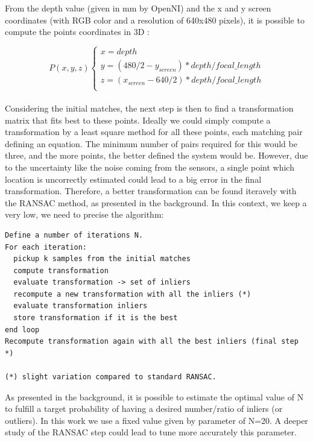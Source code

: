 From the depth value (given in mm by OpenNI) and the x and y screen coordinates (with RGB color and a resolution of 640x480 pixels), it is possible to compute the points coordinates in 3D :

\[
P(x,y,z)\left\{
\begin{array}{l}
x = depth \\
y = (480/2 - y_{screen}) * depth / focal\_length \\
z = (x_{screen} - 640/2) * depth / focal\_length \\
\end{array}
\right.
\]

\paragraph{}
Considering the initial matches, the next step is then to find a transformation matrix that fits best to these points. Ideally we could simply compute a transformation by a least square method for all these points, each matching pair defining an equation. The minimum number of pairs required for this would be three, and the more points, the better defined the system would be. However, due to the uncertainty like the noise coming from the sensors, a single point which location is uncorrectly estimated could lead to a big error in the final transformation. Therefore, a better transformation can be found iteravely with the \gls{RANSAC} method, as presented in the background. In this context, we keep a very low, we need to precise the algorithm:

\begin{verbatim}
Define a number of iterations N.
For each iteration:
  pickup k samples from the initial matches 
  compute transformation
  evaluate transformation -> set of inliers
  recompute a new transformation with all the inliers (*)
  evaluate transformation inliers
  store transformation if it is the best
end loop
Recompute transformation again with all the best inliers (final step *)

(*) slight variation compared to standard RANSAC.
\end{verbatim}

As presented in the background, it is possible to estimate the optimal value of N to fulfill a target probability of having a desired number/ratio of inliers (or outliers). In this work we use a fixed value given by parameter of N=20. A deeper study of the \gls{RANSAC} step could lead to tune more accurately this parameter.

